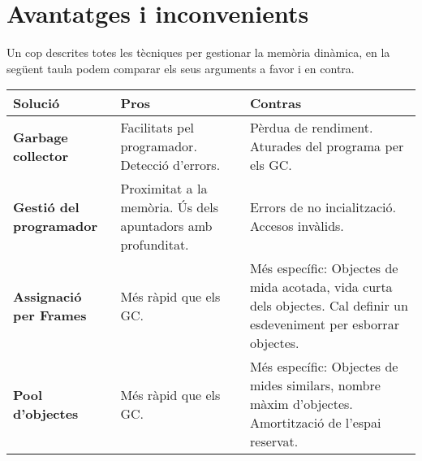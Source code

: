 \newpage
\section{Avantatges i inconvenients}

Un cop descrites totes les tècniques per gestionar la memòria dinàmica, en la següent taula podem comparar els seus arguments a favor i en contra.

\begin{table}[H]
    \begin{tabular}{|l|m{}|m{}|}
    \hline
    \textbf{Solució} &
      \textbf{Pros} &
      \textbf{Contras} \\ \hline
    \textbf{Garbage collector} &
      Facilitats pel programador. Detecció d'errors. &
      Pèrdua de rendiment. Aturades del programa per els GC. \\ \hline
    \textbf{Gestió del programador} &
      Proximitat a la memòria. Ús dels apuntadors amb profunditat. &
      Errors de no incialització. Accesos invàlids.\\ \hline
    \textbf{Assignació per Frames} &
      Més ràpid que els GC. &
      Més específic: Objectes de mida acotada, vida curta dels objectes. Cal definir un esdeveniment per esborrar objectes. \\ \hline
    \textbf{Pool d'objectes} &
      Més ràpid que els GC. &
      Més específic: Objectes de mides similars, nombre màxim d'objectes. Amortització de l'espai reservat. \\ \hline
    \end{tabular}
\end{table}
